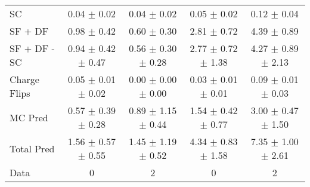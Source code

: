 \begin{tabular}{l|cccc}
                                 SC &  0.04 $\pm$  0.02 &  0.04 $\pm$  0.02 &  0.05 $\pm$  0.02 &  0.12 $\pm$  0.04 \\
                            SF + DF &  0.98 $\pm$  0.42 &  0.60 $\pm$  0.30 &  2.81 $\pm$  0.72 &  4.39 $\pm$  0.89 \\
\hline
                       SF + DF - SC &  0.94 $\pm$  0.42 $\pm$  0.47 &  0.56 $\pm$  0.30 $\pm$  0.28 &  2.77 $\pm$  0.72 $\pm$  1.38 &  4.27 $\pm$  0.89 $\pm$  2.13 \\
\hline\hline
                       Charge Flips &  0.05 $\pm$  0.01 $\pm$  0.02 &  0.00 $\pm$  0.00 $\pm$  0.00 &  0.03 $\pm$  0.01 $\pm$  0.01 &  0.09 $\pm$  0.01 $\pm$  0.03 \\
\hline
                            MC Pred &  0.57 $\pm$  0.39 $\pm$  0.28 &  0.89 $\pm$  1.15 $\pm$  0.44 &  1.54 $\pm$  0.42 $\pm$  0.77 &  3.00 $\pm$  0.47 $\pm$  1.50 \\
\hline
                         Total Pred &  1.56 $\pm$  0.57 $\pm$  0.55 &  1.45 $\pm$  1.19 $\pm$  0.52 &  4.34 $\pm$  0.83 $\pm$  1.58 &  7.35 $\pm$  1.00 $\pm$  2.61 \\
\hline\hline
                               Data &     0 &     2 &     0 &     2 \\
\hline\hline
\end{tabular}


